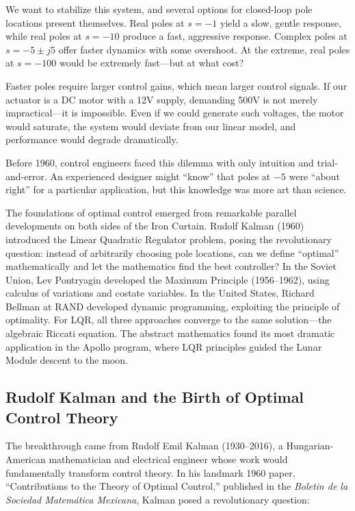 We want to stabilize this system, and several options for closed-loop pole locations present themselves. Real poles at $s = -1$ yield a slow, gentle response, while real poles at $s = -10$ produce a fast, aggressive response. Complex poles at $s = -5 \pm j5$ offer faster dynamics with some overshoot. At the extreme, real poles at $s = -100$ would be extremely fast---but at what cost?

Faster poles require larger control gains, which mean larger control signals. If our actuator is a DC motor with a 12V supply, demanding 500V is not merely impractical---it is impossible. Even if we could generate such voltages, the motor would saturate, the system would deviate from our linear model, and performance would degrade dramatically.

Before 1960, control engineers faced this dilemma with only intuition and trial-and-error. An experienced designer might ``know'' that poles at $-5$ were ``about right'' for a particular application, but this knowledge was more art than science.

\begin{historicalbox}
The foundations of optimal control emerged from remarkable parallel developments on both sides of the Iron Curtain. Rudolf Kalman (1960) introduced the Linear Quadratic Regulator problem, posing the revolutionary question: instead of arbitrarily choosing pole locations, can we define ``optimal'' mathematically and let the mathematics find the best controller? In the Soviet Union, Lev Pontryagin developed the Maximum Principle (1956--1962), using calculus of variations and costate variables. In the United States, Richard Bellman at RAND developed dynamic programming, exploiting the principle of optimality. For LQR, all three approaches converge to the same solution---the algebraic Riccati equation. The abstract mathematics found its most dramatic application in the Apollo program, where LQR principles guided the Lunar Module descent to the moon.
\end{historicalbox}

\subsection{Rudolf Kalman and the Birth of Optimal Control Theory}

The breakthrough came from Rudolf Emil Kalman (1930--2016), a Hungarian-American mathematician and electrical engineer whose work would fundamentally transform control theory. In his landmark 1960 paper, ``Contributions to the Theory of Optimal Control,'' published in the \textit{Boletin de la Sociedad Matem\'{a}tica Mexicana}, Kalman posed a revolutionary question:

